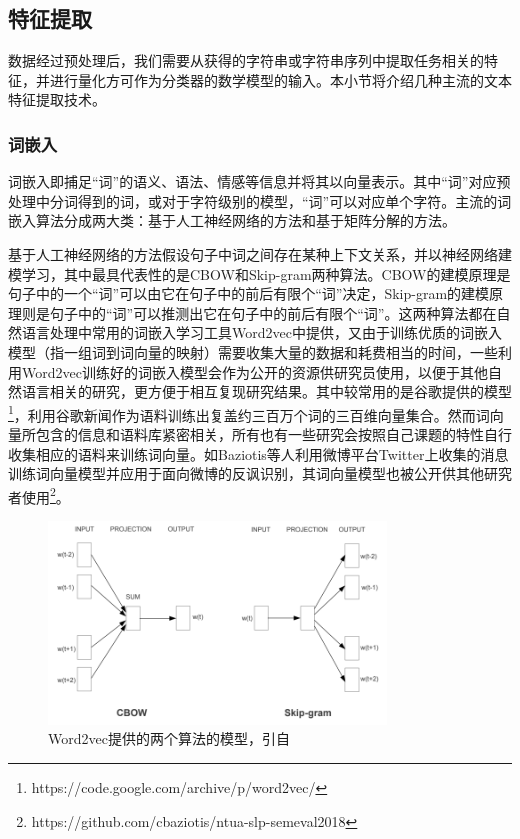 \subsection{特征提取}
\label{ssec:feature_extraction}

数据经过预处理后，我们需要从获得的字符串或字符串序列中提取任务相关的特征，并进行量化方可作为分类器的数学模型的输入。本小节将介绍几种主流的文本特征提取技术。

\subsubsection{词嵌入}
\label{sssec:embedding}

词嵌入即捕足“词”的语义、语法、情感等信息并将其以向量表示。其中“词”对应预处理中分词得到的词，或对于字符级别的模型，“词”可以对应单个字符\cite{baziotis2018ntua}。主流的词嵌入算法分成两大类：基于人工神经网络的方法和基于矩阵分解的方法。

基于人工神经网络的方法假设句子中词之间存在某种上下文关系，并以神经网络建模学习，其中最具代表性的是CBOW和Skip-gram两种算法。CBOW的建模原理是句子中的一个“词”可以由它在句子中的前后有限个“词”决定，Skip-gram的建模原理则是句子中的“词”可以推测出它在句子中的前后有限个“词”。这两种算法都在自然语言处理中常用的词嵌入学习工具Word2vec\cite{mikolov2013efficient}中提供，又由于训练优质的词嵌入模型（指一组词到词向量的映射）需要收集大量的数据和耗费相当的时间，一些利用Word2vec训练好的词嵌入模型会作为公开的资源供研究员使用，以便于其他自然语言相关的研究，更方便于相互复现研究结果。其中较常用的是谷歌提供的模型\footnote{https://code.google.com/archive/p/word2vec/}，利用谷歌新闻作为语料训练出复盖约三百万个词的三百维向量集合。然而词向量所包含的信息和语料库紧密相关，所有也有一些研究会按照自己课题的特性自行收集相应的语料来训练词向量。如Baziotis等人\cite{baziotis2017semeval2}利用微博平台Twitter上收集的消息训练词向量模型并应用于面向微博的反讽识别，其词向量模型也被公开供其他研究者使用\footnote{https://github.com/cbaziotis/ntua-slp-semeval2018}。

\begin{figure}[H]
  \centering
  \includegraphics[width=0.8\textwidth]{img/word2vec.png}
  \caption{Word2vec提供的两个算法的模型，引自\cite{mikolov2013efficient}}
  \label{fig:word2vec}
\end{figure}

